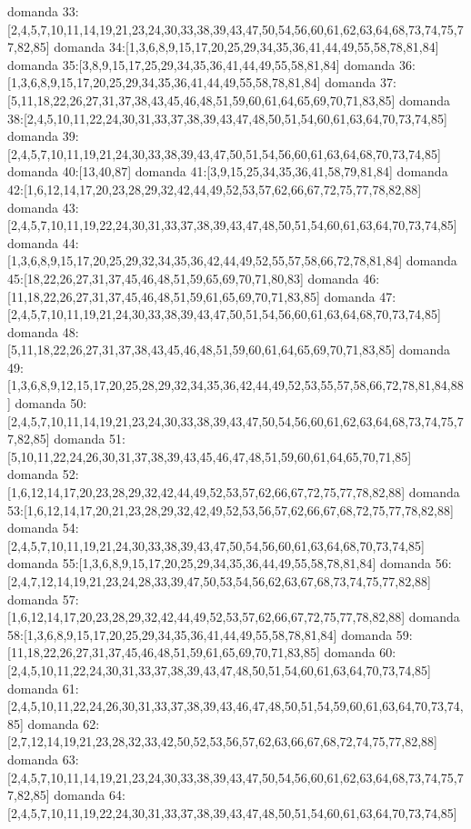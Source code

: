 domanda 33:[2,4,5,7,10,11,14,19,21,23,24,30,33,38,39,43,47,50,54,56,60,61,62,63,64,68,73,74,75,77,82,85]
domanda 34:[1,3,6,8,9,15,17,20,25,29,34,35,36,41,44,49,55,58,78,81,84]
domanda 35:[3,8,9,15,17,25,29,34,35,36,41,44,49,55,58,81,84]
domanda 36:[1,3,6,8,9,15,17,20,25,29,34,35,36,41,44,49,55,58,78,81,84]
domanda 37:[5,11,18,22,26,27,31,37,38,43,45,46,48,51,59,60,61,64,65,69,70,71,83,85]
domanda 38:[2,4,5,10,11,22,24,30,31,33,37,38,39,43,47,48,50,51,54,60,61,63,64,70,73,74,85]
domanda 39:[2,4,5,7,10,11,19,21,24,30,33,38,39,43,47,50,51,54,56,60,61,63,64,68,70,73,74,85]
domanda 40:[13,40,87]
domanda 41:[3,9,15,25,34,35,36,41,58,79,81,84]
domanda 42:[1,6,12,14,17,20,23,28,29,32,42,44,49,52,53,57,62,66,67,72,75,77,78,82,88]
domanda 43:[2,4,5,7,10,11,19,22,24,30,31,33,37,38,39,43,47,48,50,51,54,60,61,63,64,70,73,74,85]
domanda 44:[1,3,6,8,9,15,17,20,25,29,32,34,35,36,42,44,49,52,55,57,58,66,72,78,81,84]
domanda 45:[18,22,26,27,31,37,45,46,48,51,59,65,69,70,71,80,83]
domanda 46:[11,18,22,26,27,31,37,45,46,48,51,59,61,65,69,70,71,83,85]
domanda 47:[2,4,5,7,10,11,19,21,24,30,33,38,39,43,47,50,51,54,56,60,61,63,64,68,70,73,74,85]
domanda 48:[5,11,18,22,26,27,31,37,38,43,45,46,48,51,59,60,61,64,65,69,70,71,83,85]
domanda 49:[1,3,6,8,9,12,15,17,20,25,28,29,32,34,35,36,42,44,49,52,53,55,57,58,66,72,78,81,84,88]
domanda 50:[2,4,5,7,10,11,14,19,21,23,24,30,33,38,39,43,47,50,54,56,60,61,62,63,64,68,73,74,75,77,82,85]
domanda 51:[5,10,11,22,24,26,30,31,37,38,39,43,45,46,47,48,51,59,60,61,64,65,70,71,85]
domanda 52:[1,6,12,14,17,20,23,28,29,32,42,44,49,52,53,57,62,66,67,72,75,77,78,82,88]
domanda 53:[1,6,12,14,17,20,21,23,28,29,32,42,49,52,53,56,57,62,66,67,68,72,75,77,78,82,88]
domanda 54:[2,4,5,7,10,11,19,21,24,30,33,38,39,43,47,50,54,56,60,61,63,64,68,70,73,74,85]
domanda 55:[1,3,6,8,9,15,17,20,25,29,34,35,36,44,49,55,58,78,81,84]
domanda 56:[2,4,7,12,14,19,21,23,24,28,33,39,47,50,53,54,56,62,63,67,68,73,74,75,77,82,88]
domanda 57:[1,6,12,14,17,20,23,28,29,32,42,44,49,52,53,57,62,66,67,72,75,77,78,82,88]
domanda 58:[1,3,6,8,9,15,17,20,25,29,34,35,36,41,44,49,55,58,78,81,84]
domanda 59:[11,18,22,26,27,31,37,45,46,48,51,59,61,65,69,70,71,83,85]
domanda 60:[2,4,5,10,11,22,24,30,31,33,37,38,39,43,47,48,50,51,54,60,61,63,64,70,73,74,85]
domanda 61:[2,4,5,10,11,22,24,26,30,31,33,37,38,39,43,46,47,48,50,51,54,59,60,61,63,64,70,73,74,85]
domanda 62:[2,7,12,14,19,21,23,28,32,33,42,50,52,53,56,57,62,63,66,67,68,72,74,75,77,82,88]
domanda 63:[2,4,5,7,10,11,14,19,21,23,24,30,33,38,39,43,47,50,54,56,60,61,62,63,64,68,73,74,75,77,82,85]
domanda 64:[2,4,5,7,10,11,19,22,24,30,31,33,37,38,39,43,47,48,50,51,54,60,61,63,64,70,73,74,85]
